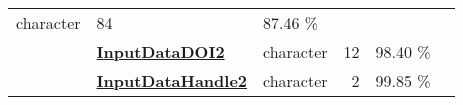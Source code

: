 \documentclass[]{article}
\begin{document}
\begin{longtable}[]{@{}lllrcl@{}}
\begin{minipage}[t]{0.11\columnwidth}
character\strut
\end{minipage} & \begin{minipage}[t]{0.10\columnwidth}\raggedleft\strut
84\strut
\end{minipage} & \begin{minipage}[t]{0.10\columnwidth}\centering\strut
87.46 \%\strut
\end{minipage} & \begin{minipage}[t]{0.12\columnwidth}\raggedright\strut
\strut
\end{minipage}\tabularnewline
\begin{minipage}[t]{0.07\columnwidth}\raggedright\strut
\strut
\end{minipage} & \begin{minipage}[t]{0.35\columnwidth}\raggedright\strut
\textbf{\protect\hyperlink{inputdatadoi2}{InputDataDOI2}}\strut
\end{minipage} & \begin{minipage}[t]{0.11\columnwidth}\raggedright\strut
character\strut
\end{minipage} & \begin{minipage}[t]{0.10\columnwidth}\raggedleft\strut
12\strut
\end{minipage} & \begin{minipage}[t]{0.10\columnwidth}\centering\strut
98.40 \%\strut
\end{minipage} & \begin{minipage}[t]{0.12\columnwidth}\raggedright\strut
\strut
\end{minipage}\tabularnewline
\begin{minipage}[t]{0.07\columnwidth}\raggedright\strut
\strut
\end{minipage} & \begin{minipage}[t]{0.35\columnwidth}\raggedright\strut
\textbf{\protect\hyperlink{inputdatahandle2}{InputDataHandle2}}\strut
\end{minipage} & \begin{minipage}[t]{0.11\columnwidth}\raggedright\strut
character\strut
\end{minipage} & \begin{minipage}[t]{0.10\columnwidth}\raggedleft\strut
2\strut
\end{minipage} & \begin{minipage}[t]{0.10\columnwidth}\centering\strut
99.85 \%\strut
\end{minipage} & \begin{minipage}[t]{0.12\columnwidth}\raggedright\strut
\strut

\end{minipage}
\end{longtable}
\end{document}
